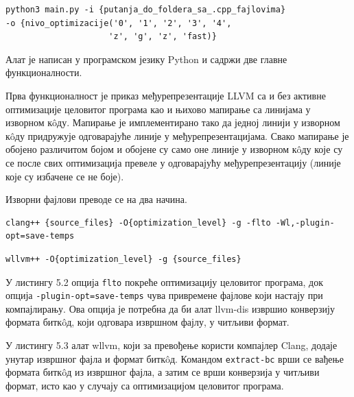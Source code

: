 \documentclass[12pt,oneside]{memoir}
\begin{document}
\begin{lstlisting}[frame=single,caption=Šablon pokretanja alata,captionpos=b]
python3 main.py -i {putanja_do_foldera_sa_.cpp_fajlovima}
-o {nivo_optimizacije('0', '1', '2', '3', '4',
                     'z', 'g', 'z', 'fast)}

\end{lstlisting}

Алат је написан у програмском језику Python и садржи две главне функционалности.

Прва функционалност је приказ међурепрезентације LLVM са и без активне оптимизације
целовитог програма као и њихово мапирање са линијама у изворном к\^{o}ду.
Мапирање је имплементирано тако да једној линији у изворном к\^{o}ду придружује
одговарајуће линије у међурепрезентацијама.
Свако мапирање је обојено различитом бојом и обојене су само оне линије у изворном
к\^{o}ду које су се после свих оптимизација превеле у одговарајућу међурепрезентацију
 (линије које су избачене се не боје).
 
Изворни фајлови преводе се на два начина.

\begin{lstlisting}[frame=single, caption=Šablon prevođenja izvornih fajlova sa optimizacijom celovitog programa, captionpos=b]
clang++ {source_files} -O{optimization_level} -g -flto -Wl,-plugin-opt=save-temps
\end{lstlisting}
 
\begin{lstlisting}[frame=single, caption=Šablon prevođenja izvornih fajlova bez optimizacije celovitog programa, captionpos=b]
wllvm++ -O{optimization_level} -g {source_files}
\end{lstlisting}
 
У листингу 5.2 опција \texttt{flto} покреће оптимизацију целовитог програма,
док опција \texttt{-plugin-opt=save-temps} чува привремене фајлове који настају
при компајлирању.
Ова опција је потребна да би алат llvm-dis извршио конверзију формата битк\^{o}д,
који одговара извршном фајлу, у читљиви формат.

У листингу 5.3 алат wllvm, који за превођење користи компајлер Clang, додаје унутар извршног фајла и формат битк\^{o}д. 
Командом \texttt{extract-bc} врши се вађење формата битк\^{o}д из извршног фајла, а затим се врши конверзија у читљиви формат, исто као у случају са оптимизацијом
целовитог програма.
\end{document}
